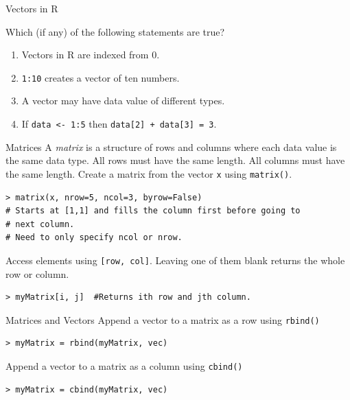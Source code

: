 \documentclass[xcolor=svgnames, 10pt, handout]{beamer}
\begin{document}
\begin{frame}[fragile]{Vectors in R}
\begin{question}
Which (if any) of the following statements are true?
\begin{enumerate}
\item Vectors in R are indexed from 0.  \onslide<+-> \pxmark
\item \texttt{1:10} creates a vector of ten numbers. \pcmark
\item A vector may have data value of different types. \pxmark
\item If \texttt{data <- 1:5} then \texttt{data[2] + data[3] = 3}. \pxmark
\end{enumerate}
\end{question}
\end{frame}


\begin{frame}[fragile]{Matrices}
A \emph{matrix} is a structure of rows and columns where each data value is the same data type.  All rows must have the same length.  All columns must have the same length.
\vfill
Create a matrix from the vector \texttt{x} using \texttt{matrix()}.
\begin{Verbatim}[commandchars=\\\{\}, xleftmargin=2em]
> matrix(x, nrow=5, ncol=3, byrow=False)
# Starts at [1,1] and fills the column first before going to
# next column.
# Need to only specify ncol or nrow.
\end{Verbatim}
\vfill
Access elements using \texttt{[row, col]}.  Leaving one of them blank returns the whole row or column.
\begin{Verbatim}[commandchars=\\\{\}, xleftmargin=2em]
> myMatrix[i, j]  #Returns ith row and jth column.
\end{Verbatim}
\end{frame}


\begin{frame}[fragile]{Matrices and Vectors}
\vfill
Append a vector to a matrix as a row using \texttt{rbind()}
\begin{Verbatim}[commandchars=\\\{\}, xleftmargin=2em]
> myMatrix = rbind(myMatrix, vec)
\end{Verbatim}
\vfill
Append a vector to a matrix as a column using \texttt{cbind()}
\begin{Verbatim}[commandchars=\\\{\}, xleftmargin=2em]
> myMatrix = cbind(myMatrix, vec)
\end{Verbatim}
\vfill
\end{frame}
\end{document}
